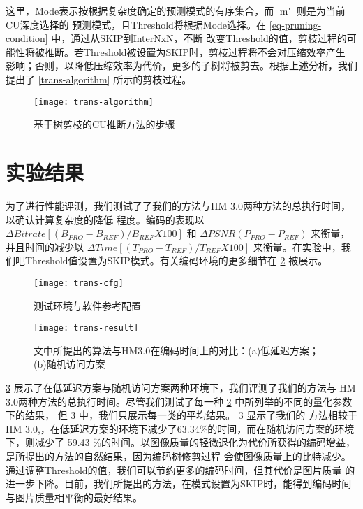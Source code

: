 这里，Mode表示按根据复杂度确定的预测模式的有序集合，而 $\mathop{m'}$ 则是为当前CU深度选择的
预测模式，且Threshold将根据Mode选择。在 \ref{eq-pruning-condition} 中，通过从SKIP到InterNxN，不断
改变Threshold的值，剪枝过程的可能性将被推断。若Threshold被设置为SKIP时，剪枝过程将不会对压缩效率产生
影响；否则，以降低压缩效率为代价，更多的子树将被剪去。根据上述分析，我们提出了 \ref{trans-algorithm} 
所示的剪枝过程。


\begin{figure}[H] %
  \centering
  \texttt{[image: trans-algorithm]}
  \caption{基于树剪枝的CU推断方法的步骤}
  \label{fig:trans-algorithm}
\end{figure}

\section{实验结果}

为了进行性能评测，我们测试了了我们的方法与HM 3.0两种方法的总执行时间，以确认计算复杂度的降低
程度。编码的表现以 $\Delta Bitrate[ (B_{PRO} - B_{REF})/B_{REF} X 100 ]$ 和 
$ \Delta PSNR(P_{PRO} - P_{REF})$ 来衡量，并且时间的减少以 $ \Delta Time[ (T_{PRO} - T_{REF})/T_{REF} X 100 ]$
来衡量。在实验中，我们吧Threshold值设置为SKIP模式。有关编码环境的更多细节在 \ref{fig:trans-cfg} 被展示。

\begin{figure}[H] %
  \centering
  \texttt{[image: trans-cfg]}
  \caption{测试环境与软件参考配置}
  \label{fig:trans-cfg}
\end{figure}

\begin{figure}[H] %
  \centering
  \texttt{[image: trans-result]}
  \caption{文中所提出的算法与HM3.0在编码时间上的对比：(a)低延迟方案；(b)随机访问方案}
  \label{fig:trans-result}
\end{figure}

\ref{fig:trans-result} 展示了在低延迟方案与随机访问方案两种环境下，我们评测了我们的方法与
HM 3.0两种方法的总执行时间。尽管我们测试了每一种 \ref{fig:trans-cfg} 中所列举的不同的量化参数下的结果，
但 \ref{fig:trans-result} 中，我们只展示每一类的平均结果。 \ref{fig:trans-result} 显示了我们的
方法相较于HM 3.0,，在低延迟方案的环境下减少了63.34\%的时间，而在随机访问方案的环境下，则减少了
59.43 \%的时间。以图像质量的轻微退化为代价所获得的编码增益，是所提出的方法的自然结果，因为编码树修剪过程
会使图像质量上的比特减少。通过调整Threshold的值，我们可以节约更多的编码时间，但其代价是图片质量
的进一步下降。目前，我们所提出的方法，在模式设置为SKIP时，能得到编码时间与图片质量相平衡的最好结果。


